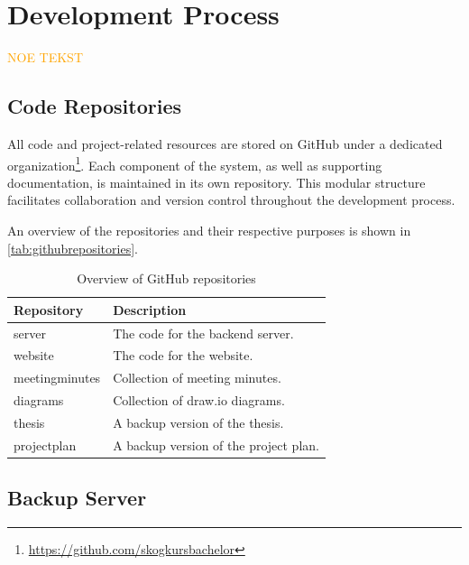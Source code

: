 \chapter{Development Process}\label{chap:developmentprocess}

\textcolor{orange}{NOE TEKST}

\section{Code Repositories}

All code and project-related resources are stored on GitHub under a dedicated organization\footnote{\url{https://github.com/skogkursbachelor}}. Each component of the system, as well as supporting documentation, is maintained in its own repository. This modular structure facilitates collaboration and version control throughout the development process.

An overview of the repositories and their respective purposes is shown in \autoref{tab:githubrepositories}.

\begin{table}[h]
    \centering
    \begin{tabular}{l|l}
        \hline
        \textbf{Repository} & \textbf{Description} \\
        \hline
        server & The code for the backend server. \\
        website & The code for the website. \\
        \hline
        meetingminutes & Collection of meeting minutes. \\
        diagrams & Collection of draw.io\tablefootnote{\url{https://www.drawio.com/}} diagrams. \\
        \hline
        thesis & A backup version of the thesis. \\
        projectplan & A backup version of the project plan. \\
        \hline
    \end{tabular}
    \caption[Overview of GitHub repositories]{Overview of GitHub repositories}
    \label{tab:githubrepositories}
\end{table}

\section{Backup Server}

